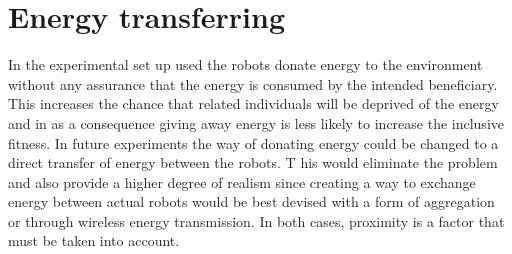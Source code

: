 \documentclass[a4paper]{book}
\begin{document}
\section{Energy transferring}
In the experimental set up used the robots donate energy to the environment without any assurance that the energy is consumed by the intended beneficiary.
This increases the chance that related individuals will be deprived of the energy and in as a consequence giving away energy is less likely to increase the inclusive fitness.
In future experiments the way of donating energy could be changed to a direct transfer of energy between the robots. T
his would eliminate the problem and also provide a higher degree of realism since creating a way to exchange energy between actual robots would be best devised with a form of aggregation or through wireless energy transmission. In both cases, proximity is a factor that must be taken into account. 
\end{document}
